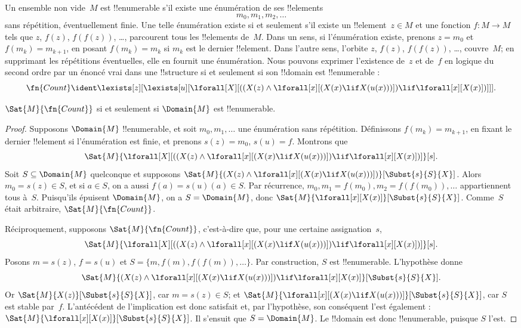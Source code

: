 \documentclass[../../../include/open-logic-section]{subfiles}
\begin{document}
Un ensemble non vide~$M$ est !!{enumerable}
s'il existe une énumération de ses !!{element}s
\[
m_0,m_1,m_2,\dots
\]
sans répétition, éventuellement finie.
Une telle énumération existe si et seulement
s'il existe un !!{element}~$z\in M$ et une
fonction $f\colon M\to M$ tels que
$z$, $f(z)$, $f(f(z))$, \dots, parcourent tous
les !!{element}s de~$M$.
Dans un sens, si l'énumération existe,
prenons $z=m_0$ et $f(m_k)=m_{k+1}$,
en posant $f(m_k)=m_k$ si $m_k$ est le dernier
!!{element}. Dans l'autre sens, l'orbite
$z$, $f(z)$, $f(f(z))$, \dots, couvre~$M$;
en supprimant les répétitions éventuelles,
elle en fournit une énumération.
Nous pouvons exprimer l'existence de~$z$ et
de~$f$ en logique du second ordre par un
énoncé vrai dans une !!{structure} si et
seulement si son !!{domain} est
!!{enumerable} :
\[
\fn{Count}\ident
\lexists[z][\lexists[u][\lforall[X]
[((X(z)\land
\lforall[x][(X(x)\lif X(u(x)))])
\lif\lforall[x][X(x)])]]].
\]

\begin{prop}
$\Sat{M}{\fn{Count}}$ si et seulement si
$\Domain{M}$ est !!{enumerable}.
\end{prop}

\begin{proof}
Supposons $\Domain{M}$ !!{enumerable}, et
soit $m_0,m_1,\dots$ une énumération sans
répétition. Définissons
$f(m_k)=m_{k+1}$, en fixant le dernier
!!{element} si l'énumération est finie,
et prenons $s(z)=m_0$, $s(u)=f$.
Montrons que
\[
\Sat{M}{\lforall[X][((X(z)\land
\lforall[x][(X(x)\lif X(u(x)))])
\lif\lforall[x][X(x)])]}[s].
\]
Soit $S\subseteq\Domain{M}$ quelconque et
supposons
$\Sat{M}{(X(z)\land\lforall[x]
[(X(x)\lif X(u(x)))])}
[\Subst{s}{S}{X}]$.
Alors $m_0=s(z)\in S$, et si $a\in S$,
on a aussi $f(a)=s(u)(a)\in S$.
Par récurrence,
$m_0,m_1=f(m_0),m_2=f(f(m_0)),\dots$
appartiennent tous à~$S$. Puisqu'ils épuisent
$\Domain{M}$, on a $S=\Domain{M}$, donc
$\Sat{M}{\lforall[x][X(x)]}
[\Subst{s}{S}{X}]$. Comme~$S$ était
arbitraire, $\Sat{M}{\fn{Count}}$.

Réciproquement, supposons
$\Sat{M}{\fn{Count}}$, c'est-à-dire que,
pour une certaine assignation~$s$,
\[
\Sat{M}{\lforall[X][((X(z)\land
\lforall[x][(X(x)\lif X(u(x)))])
\lif\lforall[x][X(x)])]}[s].
\]
Posons $m=s(z)$, $f=s(u)$ et
$S=\{m,f(m),f(f(m)),\dots\}$.
Par construction, $S$ est !!{enumerable}.
L'hypothèse donne
\[
\Sat{M}{(X(z)\land\lforall[x]
[(X(x)\lif X(u(x)))])
\lif\lforall[x][X(x)]}
[\Subst{s}{S}{X}].
\]
Or $\Sat{M}{X(z)}[\Subst{s}{S}{X}]$,
car $m=s(z)\in S$; et
$\Sat{M}{\lforall[x][(X(x)\lif X(u(x)))]}
[\Subst{s}{S}{X}]$, car $S$ est stable
par~$f$. L'antécédent de l'implication est
donc satisfait et, par l'hypothèse, son
conséquent l'est également :
$\Sat{M}{\lforall[x][X(x)]}
[\Subst{s}{S}{X}]$. Il s'ensuit que
$S=\Domain{M}$. Le !!{domain} est donc
!!{enumerable}, puisque $S$ l'est.
\end{proof}
\end{document}
